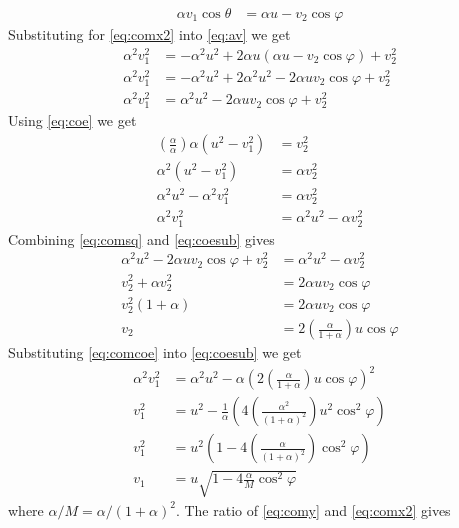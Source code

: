 \documentclass[twoside,english]{uiofysmaster/uiofysmaster}
\let\orgautoref\autoref
\renewcommand{\autoref}
        {%
		 \def\sectionautorefname{Section}%
		 \def\subsectionautorefname{Section}%
		 \def\subsubsectionautorefname{Section}%
		 \def\chapterautorefname{Chapter}%
          \orgautoref}
\begin{document}
\begin{appendices}
\begin{align}
	\alpha v_1 \cos \theta &= \alpha u - v_2 \cos \varphi
\end{align}
Substituting for \autoref{eq:comx2} into \autoref{eq:av} we get
\begin{align}\label{eq:comsq}
	\alpha^2 v_1^2 &= -\alpha^2 u^2 + 2\alpha u (\alpha u - v_2 \cos \varphi ) + v_2^2  \nonumber\\
	\alpha^2 v_1^2 &= -\alpha^2 u^2 + 2\alpha^2 u^2 - 2\alpha u v_2 \cos \varphi + v_2^2  \nonumber\\
	\alpha^2 v_1^2 &= \alpha^2 u^2 - 2\alpha u v_2 \cos \varphi + v_2^2
\end{align}
Using \autoref{eq:coe} we get
\begin{align}\label{eq:coesub}
    \left( \frac{\alpha}{\alpha} \right) \alpha (u^2 - v_1^2) &= v_2^2  \nonumber\\
    \alpha^2 (u^2 - v_1^2) &= \alpha v_2^2  \nonumber\\
	\alpha^2 u^2 - \alpha^2 v_1^2 &= \alpha v_2^2  \nonumber\\
	\alpha^2 v_1^2 &= \alpha^2 u^2 - \alpha v_2^2
\end{align}
Combining \autoref{eq:comsq} and \autoref{eq:coesub} gives
\begin{align}\label{eq:comcoe}
    \alpha^2 u^2 - 2\alpha u v_2 \cos \varphi + v_2^2 &= \alpha^2 u^2 - \alpha v_2^2  \nonumber\\
    v_2^2 + \alpha v_2^2 &= 2\alpha u v_2 \cos \varphi  \nonumber\\
    v_2^2 (1 + \alpha) &= 2\alpha u v_2 \cos \varphi  \nonumber\\
    v_2 &= 2 \left( \frac{\alpha}{1 + \alpha} \right) u \cos \varphi 
\end{align}
Substituting \autoref{eq:comcoe} into \autoref{eq:coesub} we get
\begin{align}\label{eq:coesubsub}
    \alpha^2 v_1^2 &= \alpha^2 u^2 - \alpha \left( 2 \left( \frac{\alpha}{1 + \alpha} \right) u \cos \varphi  \right)^2  \nonumber\\
    v_1^2 &= u^2 - \frac{1}{\alpha} \left( 4 \left( \frac{\alpha^2}{(1 + \alpha)^2} \right) u^2 \cos^2 \varphi  \right)  \nonumber\\
    v_1^2 &= u^2 \left(1 - 4 \left( \frac{\alpha}{(1 + \alpha)^2} \right) \cos^2 \varphi  \right)  \nonumber\\
    v_1 &= u \sqrt{1 - 4 \frac{\alpha}{M} \cos^2 \varphi}
\end{align}
where $\alpha/M = \alpha/(1 + \alpha)^2$. 
The ratio of \autoref{eq:comy} and \autoref{eq:comx2} gives

\end{appendices}
\end{document}
